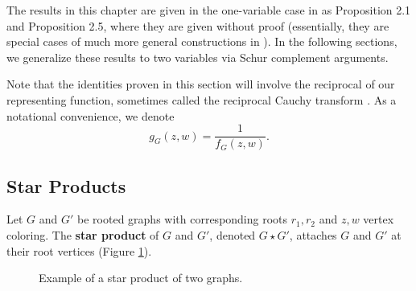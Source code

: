 \documentclass[12pt]{amsart}
\theoremstyle{remark}
\numberwithin{equation}{section}
\newcommand{\dfn}[1]{{\bf #1}\index{#1}}
\begin{document}
The results in this chapter are given in the one-variable case in \cite{ahl22} as Proposition 2.1 and Proposition 2.5, where they are given without proof (essentially, they are special cases of much more general constructions in \cite{Speicher1993BooleanC, Popa2008ANP, muraki}). In the following sections, we generalize these results to two variables via Schur complement arguments.

Note that the identities proven in this section will involve the reciprocal of our representing function, sometimes called the reciprocal Cauchy transform \cite{ahl22}. As a notational convenience, we denote
\[
g_G(z,w) = \frac{1}{f_G(z,w)}.
\]

\subsection{Star Products}

Let $G$ and $G'$ be rooted graphs with corresponding roots $r_1, r_2$ and $z, w$ vertex coloring. The \dfn{star product} of $G$ and $G'$, denoted $G \star G'$, attaches $G$ and $G'$ at their root vertices (Figure \ref{fig:starprod}).
\begin{figure}[!htbp]
    \centering
    \caption{Example of a star product of two graphs.}
    \label{fig:starprod}
\end{figure}
\end{document}
